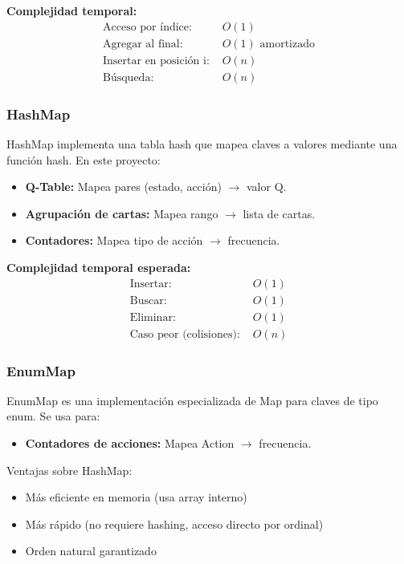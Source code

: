 \documentclass[12pt,a4paper]{article}
\begin{document}
\textbf{Complejidad temporal:}
\begin{align}
    \text{Acceso por índice: } &O(1) \\
    \text{Agregar al final: } &O(1) \text{ amortizado} \\
    \text{Insertar en posición i: } &O(n) \\
    \text{Búsqueda: } &O(n)
\end{align}

\subsubsection{HashMap}

HashMap implementa una tabla hash que mapea claves a valores mediante una función hash. En este proyecto:

\begin{itemize}
    \item \textbf{Q-Table:} Mapea pares (estado, acción) $\rightarrow$ valor Q.
    \item \textbf{Agrupación de cartas:} Mapea rango $\rightarrow$ lista de cartas.
    \item \textbf{Contadores:} Mapea tipo de acción $\rightarrow$ frecuencia.
\end{itemize}

\textbf{Complejidad temporal esperada:}
\begin{align}
    \text{Insertar: } &O(1) \\
    \text{Buscar: } &O(1) \\
    \text{Eliminar: } &O(1) \\
    \text{Caso peor (colisiones): } &O(n)
\end{align}

\subsubsection{EnumMap}

EnumMap es una implementación especializada de Map para claves de tipo enum. Se usa para:

\begin{itemize}
    \item \textbf{Contadores de acciones:} Mapea Action $\rightarrow$ frecuencia.
\end{itemize}

Ventajas sobre HashMap:
\begin{itemize}
    \item Más eficiente en memoria (usa array interno)
    \item Más rápido (no requiere hashing, acceso directo por ordinal)
    \item Orden natural garantizado
\end{itemize}
\end{document}

